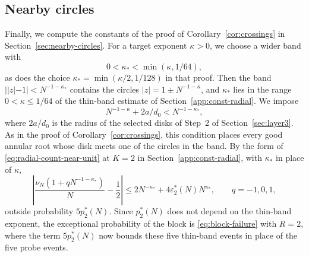 \subsection{Nearby circles}\label{app:const-nearby}
Finally, we compute the constants of the proof of
Corollary~\ref{cor:crossings} in Section~\ref{sec:nearby-circles}.
For a target exponent $\kappa>0$, we choose a wider band with
\[
 0<\kappa_*<\min(\kappa,1/64),
\]
as does the choice $\kappa_*=\min(\kappa/2,1/128)$ in that proof.
Then the band $||z|-1|<N^{-1-\kappa_*}$ contains the circles
$|z|=1\pm N^{-1-\kappa}$, and $\kappa_*$ lies in the range
$0<\kappa\le1/64$ of the thin-band estimate of
Section~\ref{app:const-radial}.
We impose
\[
 N^{-1-\kappa}+2a/d_0<N^{-1-\kappa_*},
\]
where $2a/d_0$ is the radius of the selected disks of Step~2 of
Section~\ref{sec:layer3}. As in the proof of
Corollary~\ref{cor:crossings}, this condition places every good annular
root whose disk meets one of the circles in the band.
By the form of \eqref{eq:radial-count-near-unit} at $K=2$ in
Section~\ref{app:const-radial}, with $\kappa_*$ in place of $\kappa$,
\[
 \left|\frac{\nu_N(1+qN^{-1-\kappa_*})}N-\frac12\right|
 \le2N^{-\kappa_*}+4\varepsilon_2^*(N)N^{\kappa_*},\qquad q=-1,0,1,
\]
outside probability $5p_2^*(N)$.
Since $p_2^*(N)$ does not depend on the thin-band exponent, the
exceptional probability of the block is \eqref{eq:block-failure} with
$R=2$, where the term $5p_2^*(N)$ now bounds these five thin-band events
in place of the five probe events.
